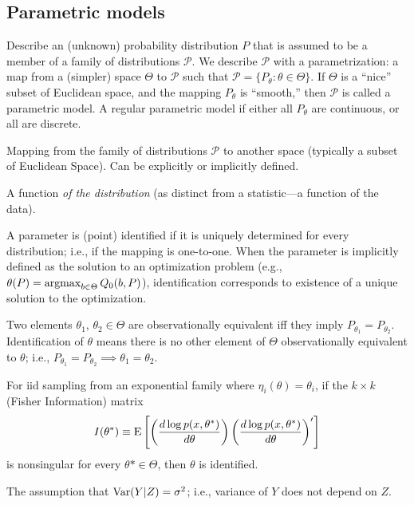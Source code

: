 \documentclass[8pt,letterpaper, landscape]{extarticle} %
\renewcommand{\ln}{\log}
\begin{document}
\begin{multicols}{3}
\begin{description}
\subsection{Parametric models}
 Describe an (unknown) probability distribution $ P $ that is assumed to be a member of a family of distributions $ \mathcal{P} $. We describe $ \mathcal{P} $ with a parametrization: a map from a (simpler) space $ \Theta $ to $ \mathcal{P} $ such that $ \mathcal{P} = \{ P_\theta \colon \theta \in \Theta \} $. If $ \Theta $ is a ``nice'' subset of Euclidean space, and the mapping $ P_\theta $ is ``smooth,'' then $ \mathcal{P} $ is called a parametric model. A regular parametric model if either all $ P_\theta $ are continuous, or all are discrete.

 Mapping from the family of distributions $ \mathcal{P} $ to another space (typically a subset of Euclidean Space). Can be explicitly or implicitly defined.

A function \textit{of the distribution} (as distinct from a statistic---a function of the data).


 A parameter is (point) identified if it is uniquely determined for every distribution; i.e., if the mapping is one-to-one. When the parameter is implicitly defined as the solution to an optimization problem (e.g., $ \theta(P) = \operatorname*{argmax}_{b \in \Theta} Q_0 (b,P) $), identification corresponds to existence of a unique solution to the optimization.

Two elements $ \theta_1 $, $ \theta_2 \in \Theta $ are observationally equivalent iff they imply $ P_{\theta_1} = P_{\theta_2} $. Identification of $ \theta $ means there is no other element of $ \Theta $ observationally equivalent to $ \theta $; i.e., $ P_{\theta_1} = P_{\theta_2} \implies \theta_1 = \theta_2 $.

 For iid sampling from an exponential family where $ \eta_i (\theta) = \theta_i $, if the $ k \times k $ (Fisher Information) matrix
$$ I(\theta^*) \equiv \E \left[ \left( \frac{d \ln p(x, \theta^*)}{d \theta} \right) \left( \frac{d \ln p(x, \theta^*)}{d \theta} \right)' \right] $$
is nonsingular for every $ \theta* \in \Theta $, then $ \theta $ is identified.

 The assumption that $ \operatorname{Var} (Y|Z) = \sigma^2 $; i.e., variance of $ Y $ does not depend on $ Z $.


\end{description}
\end{multicols}
\end{document}
